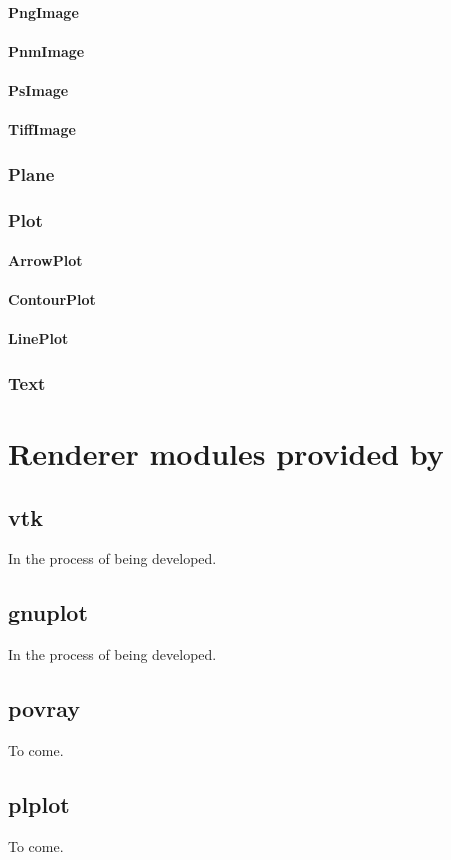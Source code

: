 \subsubsection{PngImage}

\subsubsection{PnmImage}

\subsubsection{PsImage}

\subsubsection{TiffImage}

\subsection{Plane}

\subsection{Plot}

\subsubsection{ArrowPlot}

\subsubsection{ContourPlot}

\subsubsection{LinePlot}

\subsection{Text}


\chapter{Renderer modules provided by \pyvisi}

\section{vtk}

In the process of being developed.

\section{gnuplot}

In the process of being developed.

\section{povray}

To come.

\section{plplot}

To come.

